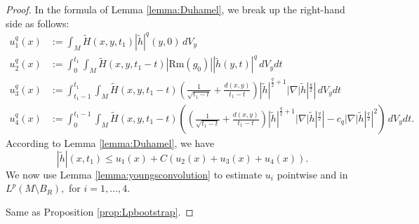 \documentclass[12pt]{amsart}
\renewcommand{\1}{{\mathbf 1}}
\newcommand{\Rm}{\mathrm{Rm}}
\theoremstyle{others}
\numberwithin{equation}{section}
\begin{document}
\begin{proof} 






In the formula of Lemma \ref{lemma:Duhamel}, we break up the right-hand side as follows:
\begin{equation}\label{smallpLpbootstrap:RHSsplitting}
    \begin{split}
        u_1^q(x) & := \int_M \tilde{H}(x,y,t_1) |\tilde{h}|^q(y,0) \, dV_y \\
        u_2^q(x) & := \int_0^{t_1} \!\!\!\! \int_M \tilde{H}(x,y,t_1 - t) |\Rm(g_0)| |\tilde{h}(y,t)|^q \, dV_y dt \\
        u_3^q(x) & := \int_{t_1 - 1}^{t_1} \!\! \int_M \tilde{H}(x,y,t_1 - t) \left( \frac{1}{\sqrt{t_1-t}} + \frac{d(x,y)}{t_1-t} \right) |\tilde{h}|^{\frac{q}{2} + 1} |\nabla |\tilde{h}|^{\frac{q}{2}} | \, dV_y dt \\
        u_4^q(x) & := \int_0^{t_1 - 1} \!\!\!\! \int_M \tilde{H}(x,y,t_1 - t) \left( \left( \frac{1}{\sqrt{t_1-t}} + \frac{d(x,y)}{t_1 - t}  \right) |\tilde{h}|^{\frac{q}{2} + 1} |\nabla |\tilde{h}|^{\frac{q}{2}} | - c_q |\nabla |\tilde{h}|^{\frac{q}{2}} |^2 \right) \, dV_y dt. 
    \end{split}
\end{equation}
According to Lemma \ref{lemma:Duhamel}, we have
\begin{equation}\label{smallphlessthanu1tou4}
    |\tilde{h}|(x,t_1) \leq u_1(x) + C \left( u_2(x) + u_3(x) + u_4(x) \right).
    \end{equation}
    We now use Lemma \ref{lemma:youngsconvolution} to estimate $u_i$ pointwise and in $L^{p}(M \setminus B_R),$ for $i = 1, \ldots, 4.$ 
       

       \vspace{2mm}
       
        Same as Proposition \ref{prop:Lpbootstrap}.

       \vspace{2mm}


\end{proof}
\end{document}
